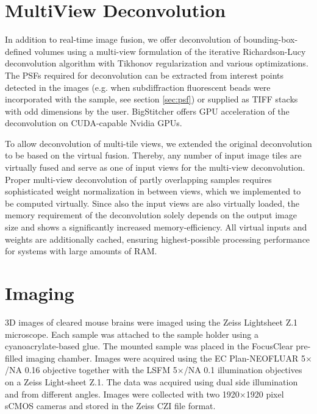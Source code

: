 \section{MultiView Deconvolution}
\label{sec:mvdecon}

In addition to real-time image fusion, we offer deconvolution of bounding-box-defined volumes using a multi-view formulation of the iterative Richardson-Lucy deconvolution algorithm\cite{richardson, lucy} with Tikhonov regularization\cite{Tikhonov/Arsenin/77} and various optimizations\cite{mvdecon}. The PSFs required for deconvolution can be extracted from interest points detected in the images (e.g. when subdiffraction fluorescent beads were incorporated with the sample, see section \ref{sec:psf}) or supplied as TIFF stacks with odd dimensions by the user. BigStitcher offers GPU acceleration of the deconvolution on CUDA-capable Nvidia GPUs.

To allow deconvolution of multi-tile views, we extended the original deconvolution\cite{mvdecon} to be based on the virtual fusion. Thereby, any number of input image tiles are virtually fused and serve as one of input views for the multi-view deconvolution. Proper multi-view deconvolution of partly overlapping samples requires sophisticated weight normalization in between views\cite{mvdecon}, which we implemented to be computed virtually. Since also the input views are also virtually loaded, the memory requirement of the deconvolution solely depends on the output image size and shows a significantly increased memory-efficiency. All virtual inputs and weights are additionally cached, ensuring highest-possible processing performance for systems with large amounts of RAM.

\section{Imaging}
\label{sec:imaging}

3D images of cleared mouse brains were imaged using the Zeiss Lightsheet Z.1 microscope. Each sample was attached to the sample holder using a cyanoacrylate-based glue. The mounted sample was placed in the FocusClear pre-filled imaging chamber. Images were acquired using the EC Plan-NEOFLUAR 5$\times$/NA 0.16 objective together with the LSFM 5$\times$/NA 0.1 illumination objectives on a Zeiss Light-sheet Z.1. The data was acquired using dual side illumination and from different angles. Images were collected with two 1920$\times$1920 pixel sCMOS cameras and stored in the Zeiss CZI file format.

